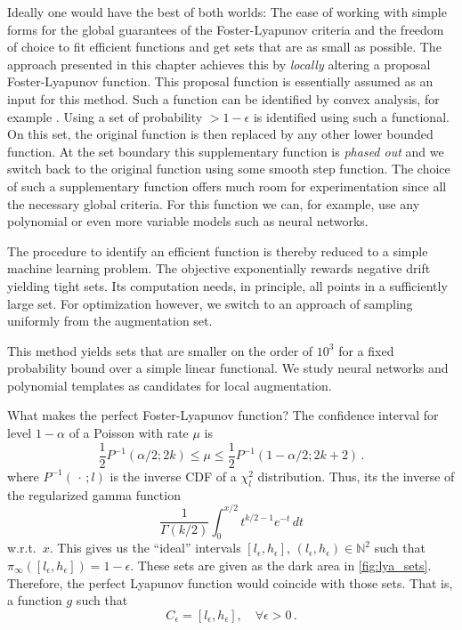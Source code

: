 Ideally one would have the best of both worlds: The ease of working with simple forms for the global guarantees of the Foster-Lyapunov criteria and the freedom of choice to fit efficient functions and get sets that are as small as possible.
The approach presented in this chapter achieves this by \emph{locally} altering a proposal Foster-Lyapunov function.
This proposal function is essentially assumed as an input for this method.
Such a function can be identified by convex analysis, for example \parencite{gupta2014scalable}.
Using a set of probability $>1-\epsilon$ is identified using such a functional.
On this set, the original function is then replaced by any other lower bounded function.
At the set boundary this supplementary function is \emph{phased out} and we switch back to the original function using some smooth step function.
The choice of such a supplementary function offers much room for experimentation since all the necessary global criteria.
For this function we can, for example, use any polynomial or even more variable models such as neural networks.

The procedure to identify an efficient function is thereby reduced to a simple machine learning problem.
The objective exponentially rewards negative drift yielding tight sets.
Its computation needs, in principle, all points in a sufficiently large set.
For optimization however, we switch to an approach of sampling uniformly from the augmentation set.

This method yields sets that are smaller on the order of $10^3$ for a fixed probability bound over a simple linear functional.
We study neural networks and polynomial templates as candidates for local augmentation.
\begin{example}
What makes the perfect Foster-Lyapunov function?
The confidence interval for level $1-\alpha$ of a Poisson with rate $\mu$ is
\[
\frac{1}{2}P^{-1}(\alpha/2; 2k)\le\mu\leq\frac{1}{2}P^{-1}(1-\alpha/2;{2k+2})\,.
\]
where $P^{-1}(\,\cdot\,; l)$ is the inverse \ac{CDF} of a $\chi^2_{l}$ distribution.
Thus, its the inverse of the regularized gamma function
\[
	\frac{1}{\Gamma(k/2)}\int_0^{x/2} t^{k/2 - 1} e^{-t}\,dt
\]
w.r.t.\ $x$.
	This gives us the ``ideal'' intervals $[l_{\epsilon},h_{\epsilon}]$, $(l_{\epsilon},h_{\epsilon})\in\mathbb{N}^2$ such that
	$\pi_{\infty}([l_{\epsilon},h_{\epsilon}])=1-\epsilon$. These sets are given as the dark area in \autoref{fig:lya_sets}.
Therefore, the perfect Lyapunov function would coincide with those sets. That is,
a function $g$ such that
\[
	C_{\epsilon}
	=
	\left[l_{\epsilon}, h_{\epsilon}\right], \quad \forall\epsilon> 0\,.
\]
\end{example}

